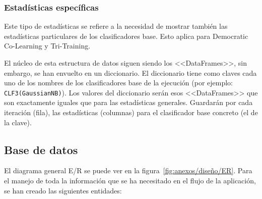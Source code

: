 \subsubsection{Estadísticas específicas}
Este tipo de estadísticas se refiere a la necesidad de mostrar también las
estadísticas particulares de los clasificadores base. Esto aplica para
Democratic Co-Learning y Tri-Training.

El núcleo de esta estructura de datos siguen siendo los <<DataFrames>>, sin
embargo, se han envuelto en un diccionario. El diccionario tiene como claves
cada uno de los nombres de los clasificadores base de la ejecución (por ejemplo:
\texttt{CLF3(GaussianNB)}). Los valores del diccionario serán esos
<<DataFrames>> que son exactamente iguales que para las estadísticas generales.
Guardarán por cada iteración (fila), las estadísticas (columnas) para el
clasificador base concreto (el de la clave).

\subsection{Base de datos}

El diagrama general E/R se puede ver en la figura~\ref{fig:anexos/diseño/ER}.
Para el manejo de toda la información que se ha necesitado en el flujo de la
aplicación, se han creado las siguientes entidades:

